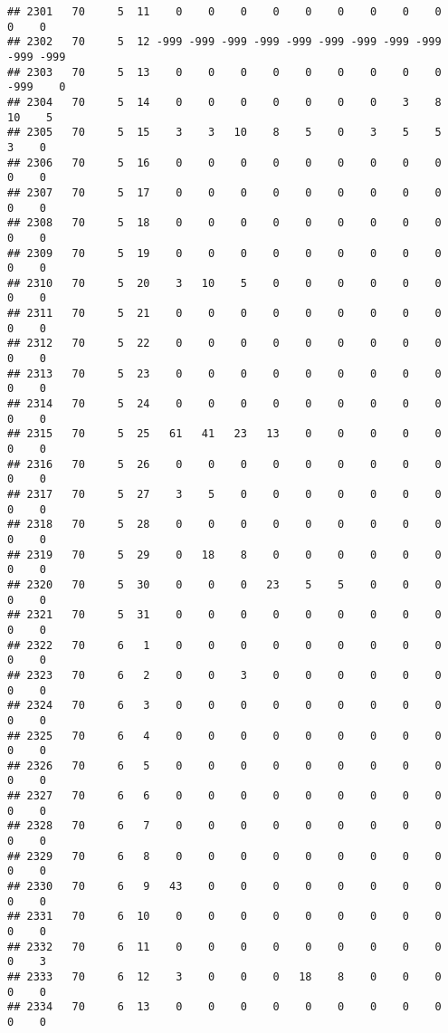 \documentclass[]{article}
\begin{document}
\begin{verbatim}
## 2301   70     5  11    0    0    0    0    0    0    0    0    0    0    0
## 2302   70     5  12 -999 -999 -999 -999 -999 -999 -999 -999 -999 -999 -999
## 2303   70     5  13    0    0    0    0    0    0    0    0    0 -999    0
## 2304   70     5  14    0    0    0    0    0    0    0    3    8   10    5
## 2305   70     5  15    3    3   10    8    5    0    3    5    5    3    0
## 2306   70     5  16    0    0    0    0    0    0    0    0    0    0    0
## 2307   70     5  17    0    0    0    0    0    0    0    0    0    0    0
## 2308   70     5  18    0    0    0    0    0    0    0    0    0    0    0
## 2309   70     5  19    0    0    0    0    0    0    0    0    0    0    0
## 2310   70     5  20    3   10    5    0    0    0    0    0    0    0    0
## 2311   70     5  21    0    0    0    0    0    0    0    0    0    0    0
## 2312   70     5  22    0    0    0    0    0    0    0    0    0    0    0
## 2313   70     5  23    0    0    0    0    0    0    0    0    0    0    0
## 2314   70     5  24    0    0    0    0    0    0    0    0    0    0    0
## 2315   70     5  25   61   41   23   13    0    0    0    0    0    0    0
## 2316   70     5  26    0    0    0    0    0    0    0    0    0    0    0
## 2317   70     5  27    3    5    0    0    0    0    0    0    0    0    0
## 2318   70     5  28    0    0    0    0    0    0    0    0    0    0    0
## 2319   70     5  29    0   18    8    0    0    0    0    0    0    0    0
## 2320   70     5  30    0    0    0   23    5    5    0    0    0    0    0
## 2321   70     5  31    0    0    0    0    0    0    0    0    0    0    0
## 2322   70     6   1    0    0    0    0    0    0    0    0    0    0    0
## 2323   70     6   2    0    0    3    0    0    0    0    0    0    0    0
## 2324   70     6   3    0    0    0    0    0    0    0    0    0    0    0
## 2325   70     6   4    0    0    0    0    0    0    0    0    0    0    0
## 2326   70     6   5    0    0    0    0    0    0    0    0    0    0    0
## 2327   70     6   6    0    0    0    0    0    0    0    0    0    0    0
## 2328   70     6   7    0    0    0    0    0    0    0    0    0    0    0
## 2329   70     6   8    0    0    0    0    0    0    0    0    0    0    0
## 2330   70     6   9   43    0    0    0    0    0    0    0    0    0    0
## 2331   70     6  10    0    0    0    0    0    0    0    0    0    0    0
## 2332   70     6  11    0    0    0    0    0    0    0    0    0    0    3
## 2333   70     6  12    3    0    0    0   18    8    0    0    0    0    0
## 2334   70     6  13    0    0    0    0    0    0    0    0    0    0    0

\end{verbatim}
\end{document}
